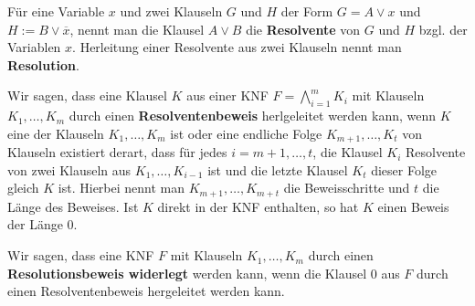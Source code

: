 \begin{defn}
	Für eine Variable $x$ und  zwei Klauseln $G$ und $H$ der Form $G=A \vee x$ und $H:=B \vee \overline{x}$, nennt man die Klausel $A \vee B$ die \textbf{Resolvente} von $G$ und $H$ bzgl. der Variablen $x$. Herleitung einer Resolvente aus zwei Klauseln nennt man \textbf{Resolution}. 
	
	Wir sagen, dass eine Klausel $K$ aus einer KNF $F = \bigwedge_{i=1}^m K_i$ mit  Klauseln $K_1,\ldots,K_m$ durch einen \textbf{Resolventenbeweis} herlgeleitet werden kann, wenn $K$ eine der Klauseln $K_1,\ldots,K_m $ ist oder  eine endliche Folge $K_{m+1},\ldots,K_t$ von Klauseln existiert derart, dass für jedes $i =m+1,\ldots,t$, die Klausel $K_i$ Resolvente von zwei Klauseln aus  $K_1,\ldots,K_{i-1}$ ist und  die letzte Klausel $K_t$ dieser Folge gleich $K$ ist. Hierbei nennt man $K_{m+1},\ldots,K_{m+t}$ die Beweisschritte und $t$ die Länge des Beweises. Ist $K$ direkt in der KNF enthalten, so hat $K$ einen Beweis der Länge $0$. 
	
	Wir sagen, dass eine KNF $F$ mit  Klauseln $K_1,\ldots,K_m$ durch einen \textbf{ Resolutionsbeweis widerlegt} werden kann, wenn die Klausel $0$ aus $F$ durch einen Resolventenbeweis hergeleitet werden kann. 
\end{defn} 

